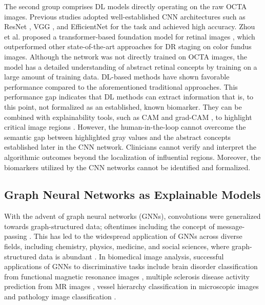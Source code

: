 The second group comprises DL models directly operating on the raw OCTA images. Previous studies adopted well-established CNN architectures such as ResNet \cite{xie2017aggregated}, VGG \cite{simonyan2014very}, and EfficientNet \cite{tan2019efficientnet} for the task and achieved high accuracy. Zhou et al. proposed a transformer-based foundation model for retinal images \cite{zhou2023foundation}, which outperformed other state-of-the-art approaches for DR staging on color fundus images. Although the network was not directly trained on OCTA images, the model has a detailed understanding of abstract retinal concepts by training on a large amount of training data.
DL-based methods have shown favorable performance compared to the aforementioned traditional approaches. This performance gap indicates that DL methods can extract information that is, to this point, not formalized as an established, known biomarker. They can be combined with explainability tools, such as CAM \cite{zhou2016learning} and grad-CAM \cite{selvaraju2017grad}, to highlight critical image regions \cite{heisler2020ensemble, ryu2021deep, zang2022diabetic}. However, the human-in-the-loop cannot overcome the semantic gap between highlighted gray values and the abstract concepts established later in the CNN network. Clinicians cannot verify and interpret the algorithmic outcomes beyond the localization of influential regions. Moreover, the biomarkers utilized by the CNN networks cannot be identified and formalized. 



\subsection{Graph Neural Networks as Explainable Models} %
With the advent of graph neural networks (GNNs), convolutions were generalized towards graph-structured data; oftentimes including the concept of message-passing \cite{velickovic2017graph, kipf2016semi, hamilton2017inductive}. 
This has led to the widespread application of GNNs across diverse fields, including chemistry, physics, medicine, and social sciences, where graph-structured data is abundant \cite{zhou2020graph}. In biomedical image analysis, successful applications of GNNs to discriminative tasks include brain disorder classification from functional magnetic resonance images \cite{zhang2022classification}, multiple sclerosis disease activity prediction from MR images \cite{prabhakar2023self}, vessel hierarchy classification in microscopic images \cite{paetzold2021whole} and pathology image classification \cite{wang2023ccf}. 

